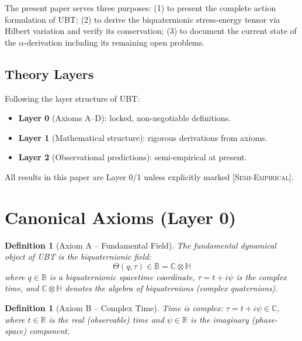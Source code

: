 \documentclass[12pt,a4paper]{article}
\newtheorem{definition}[theorem]{Definition}
\newcommand{\B}{\mathbb{B}}
\newcommand{\C}{\mathbb{C}}
\renewcommand{\H}{\mathbb{H}}
\begin{document}
The present paper serves three purposes: (1) to present the complete action
formulation of UBT; (2) to derive the biquaternionic stress-energy tensor via
Hilbert variation and verify its conservation; (3) to document the current state
of the $\alpha$-derivation including its remaining open problems.

\subsection{Theory Layers}

Following the layer structure of UBT:
\begin{itemize}
  \item \textbf{Layer 0} (Axioms A--D): locked, non-negotiable definitions.
  \item \textbf{Layer 1} (Mathematical structure): rigorous derivations from axioms.
  \item \textbf{Layer 2} (Observational predictions): semi-empirical at present.
\end{itemize}

All results in this paper are Layer 0/1 unless explicitly marked
\textsc{[Semi-Empirical]}.

\section{Canonical Axioms (Layer 0)}
\label{sec:axioms}

\begin{definition}[Axiom A -- Fundamental Field]
The fundamental dynamical object of UBT is the biquaternionic field:
\begin{equation}
  \Theta(q,\tau) \in \B = \C \otimes \H
\end{equation}
where $q \in \B$ is a biquaternionic spacetime coordinate, $\tau = t + i\psi$ is
the complex time, and $\mathbb{C}\otimes\mathbb{H}$ denotes the algebra of
\emph{biquaternions} (complex quaternions).
\end{definition}

\begin{definition}[Axiom B -- Complex Time]
Time is complex: $\tau = t + i\psi \in \mathbb{C}$, where $t \in \mathbb{R}$
is the real (observable) time and $\psi \in \mathbb{R}$ is the imaginary
(phase-space) component.
\end{definition}
\end{document}
